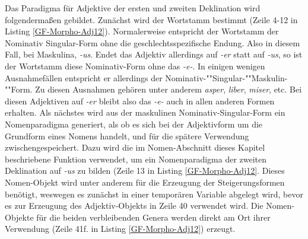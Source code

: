 Das Paradigma für Adjektive der ersten und zweiten Deklination wird folgendermaßen gebildet. Zunächst wird der Wortstamm bestimmt (Zeile 4-12 in Listing \ref{GF-Morpho-Adj12}). Normalerweise entspricht der Wortstamm der Nominativ Singular-Form ohne die geschlechtsspezifische Endung. Also in diesem Fall, bei Maskulina, \textit{-us}. Endet das Adjektiv allerdings auf \textit{-er} statt auf \textit{-us}, so ist der Wortstamm diese Nominativ-Form ohne das \textit{-e-}. In einigen wenigen Ausnahmefällen entspricht er allerdings der Nominativ-""Singular-""Maskulin-""Form. Zu diesen Ausnahmen gehören unter anderem \textit{asper}, \textit{liber}, \textit{miser}, etc. Bei diesen Adjektiven auf \textit{-er} bleibt also das \textit{-e-} auch in allen anderen Formen erhalten. Als nächstes wird aus der maskulinen Nominativ-Singular-Form ein Nomenparadigma generiert, als ob es sich bei der Adjektivform um die Grundform eines Nomens handelt, und für die spätere Verwendung zwischengespeichert. Dazu wird die im Nomen-Abschnitt dieses Kapitel beschriebene Funktion verwendet, um ein Nomenparadigma der zweiten Deklination auf \textit{-us} zu bilden (Zeile 13 in Listing \ref{GF-Morpho-Adj12}. Dieses Nomen-Objekt wird unter anderem für die Erzeugung der Steigerungsformen benötigt, weswegen es zunächst in einer temporären Variable abgelegt wird, bevor es zur Erzeugung des Adjektiv-Objekts in Zeile 40 verwendet wird. Die Nomen-Objekte für die beiden verbleibenden Genera werden direkt am Ort ihrer Verwendung (Zeile 41f. in Listing \ref{GF-Morpho-Adj12}) erzeugt. \par
\FloatBarrier
